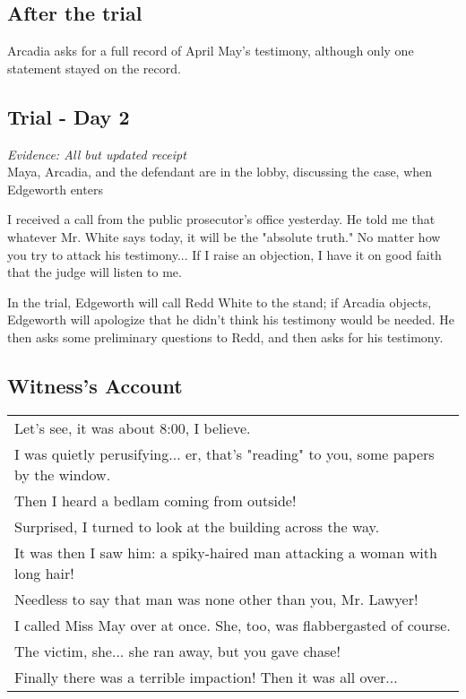 \subsection{After the trial}
Arcadia asks for a full record of April May's testimony, although only one statement stayed on the record.


\subsection{Trial - Day 2}
\textit{Evidence: All but updated receipt}\\
Maya, Arcadia, and the defendant are in the lobby, discussing the case, when Edgeworth enters
\begin{center}
I received a call from the public prosecutor's office yesterday. He told me that whatever Mr. White says today, it will be the "absolute truth." No matter how you try to attack his testimony... If I raise an objection, I have it on good faith that the judge will listen to me.
\end{center}

In the trial, Edgeworth will call Redd White to the stand; if Arcadia objects, Edgeworth will apologize that he didn't think his testimony would be needed. He then asks some preliminary questions to Redd, and then asks for his testimony.

\subsection{Witness's Account}
\begin{tabular}{p{11cm}}
Let's see, it was about 8:00, I believe.\\
I was quietly perusifying... er, that's "reading" to you, some papers by the window.\\
Then I heard a bedlam coming from outside!\\
Surprised, I turned to look at the building across the way.\\
It was then I saw him: a spiky-haired man attacking a woman with long hair!\\
Needless to say that man was none other than you, Mr. Lawyer!\\
I called Miss May over at once. She, too, was flabbergasted of course.\\
The victim, she... she ran away, but you gave chase!\\
Finally there was a terrible impaction! Then it was all over... \\
\end{tabular}


